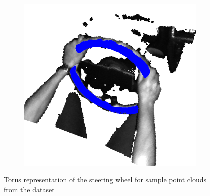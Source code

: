 \begin{figure}[ht]
\begin{subfigure}[t]{0.3\textwidth}
    \end{subfigure}\hfill
    \begin{subfigure}[t]{0.3\textwidth}
        \centering
        \includegraphics[width=\textwidth]{media/chapter 3/torus6.png}
    \end{subfigure}
    \caption{Torus representation of the steering wheel 
    for sample point clouds from the dataset}
    \label{fig:sample_toruses}
\end{figure}
